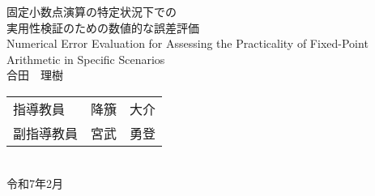 \documentclass[a4paper,12pt]{ltjsreport}
\begin{document}
\begin{titlepage}
\Large
\begin{center}
\vspace*{50mm}
    {\huge 固定小数点演算の特定状況下での\\実用性検証のための数値的な誤差評価} \\
\vspace*{10mm}
    {\huge Numerical Error Evaluation for Assessing the Practicality of Fixed-Point Arithmetic in Specific Scenarios} \\
\vspace*{50mm}
合田　理樹

\vspace*{10mm}
\begin{tabular}{ll}
    指導教員 & 降籏　大介 \\
    副指導教員 & 宮武　勇登 \\
\end{tabular}
\vspace*{20mm} \\
令和7年2月 \\
\end{center}
\end{titlepage}

\tableofcontents

















\appendix



\end{document}
